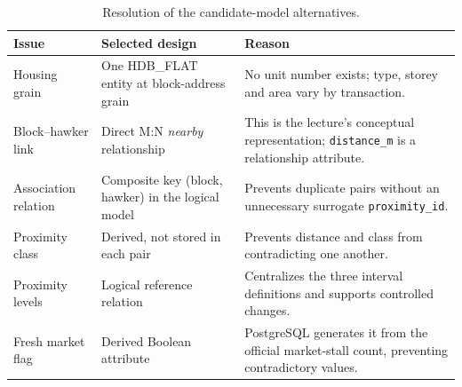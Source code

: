 \documentclass[11pt,a4paper]{article}
\begin{document}
\begin{table}[H]
\centering
\caption{Resolution of the candidate-model alternatives.}
\label{tab:ermchoices}
\begin{tabular}{p{}p{}p{}}
\toprule
Issue & Selected design & Reason \\
\midrule
Housing grain & One HDB\_FLAT entity at block-address grain & No unit number exists; type, storey and area vary by transaction. \\
Block--hawker link & Direct M:N \emph{nearby} relationship & This is the lecture's conceptual representation; \texttt{distance\_m} is a relationship attribute. \\
Association relation & Composite key (block, hawker) in the logical model & Prevents duplicate pairs without an unnecessary surrogate \texttt{proximity\_id}. \\
Proximity class & Derived, not stored in each pair & Prevents distance and class from contradicting one another. \\
Proximity levels & Logical reference relation & Centralizes the three interval definitions and supports controlled changes. \\
Fresh market flag & Derived Boolean attribute & PostgreSQL generates it from the official market-stall count, preventing contradictory values. \\
\bottomrule
\end{tabular}
\end{table}
\end{document}
